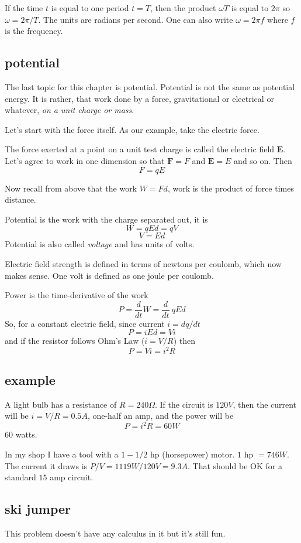 \documentclass[11pt, oneside]{article}
\begin{document}
If the time $t$ is equal to one period $t = T$, then the product $\omega T$ is equal to $2 \pi$ so $\omega = 2 \pi / T$.  The units are radians per second.  One can also write $\omega = 2 \pi f$ where $f$ is the frequency.

\subsection*{potential}

The last topic for this chapter is potential.  Potential is not the same as potential energy.  It is rather, that work done by a force, gravitational or electrical or whatever, \emph{on a unit charge or mass}.

Let's start with the force itself.  As our example, take the electric force.

The force exerted at a point on a unit test charge is called the electric field $\mathbf{E}$.  Let's agree to work in one dimension so that $\mathbf{F} = F$ and $\mathbf{E} = E$ and so on.  Then
\[ F = qE \]

Now recall from above that the work $W = Fd$, work is the product of force times distance.  

Potential is the work with the charge separated out, it is
\[ W = qEd = qV \]
\[ V = Ed \]
Potential is also called \emph{voltage} and has units of volts.

Electric field strength is defined in terms of newtons per coulomb, which now makes sense.  One volt is defined as one joule per coulomb.

Power is the time-derivative of the work
\[ P = \frac{d}{dt} W = \frac{d}{dt} \ qEd \]
So, for a constant electric field, since current $i = dq/dt$
\[ P = iEd = Vi \]
and if the resistor follows Ohm's Law ($i = V/R$) then
\[ P = Vi = i^2 R \]

\subsection*{example}
A light bulb has a resistance of $R = 240 \Omega$.  If the circuit is $120 V$, then the current will be $i = V/R = 0.5 A$, one-half an amp, and the power will be
\[ P = i^2 R = 60 W \]
60 watts.

In my shop I have a tool with a $1-1/2$ hp (horsepower) motor.  $1$ hp $= 746 W$.  The current it draws is $P/V = 1119 W / 120 V = 9.3 A$.  That should be OK for a standard $15$ amp circuit.

\subsection*{ski jumper}
This problem doesn't have any calculus in it but it's still fun.
\end{document}
